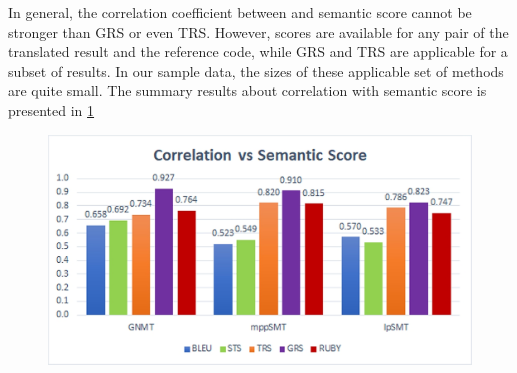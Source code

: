In general, the correlation coefficient between {\model} and semantic score cannot be 
stronger than GRS or even TRS. However, {\model} scores are available for any pair 
of the translated result and the reference code, while GRS and TRS are applicable for 
a subset of results. In our sample data, the sizes of these applicable set of methods
are quite small.
The summary results about correlation with semantic score is presented in \ref{fig:summary}


	    
\begin{figure}
\centering
\includegraphics[scale=0.85]{img/summary.jpg}
\label{fig:summary}
\end{figure}